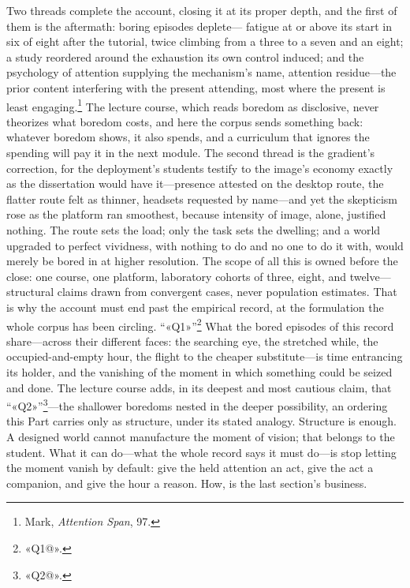 Two threads complete the account, closing it at its proper depth, and the first of them is the aftermath: boring episodes deplete--- fatigue at or above its start in six of eight after the tutorial, twice climbing from a three to a seven and an eight; a study reordered around the exhaustion its own control induced; and the psychology of attention supplying the mechanism's name, attention residue---the prior content interfering with the present attending, most where the present is least engaging.\footnote{Mark, \textit{Attention Span}, 97.} The lecture course, which reads boredom as disclosive, never theorizes what boredom costs, and here the corpus sends something back: whatever boredom shows, it also spends, and a curriculum that ignores the spending will pay it in the next module. The second thread is the gradient's correction, for the deployment's students testify to the image's economy exactly as the dissertation would have it---presence attested on the desktop route, the flatter route felt as thinner, headsets requested by name---and yet the skepticism rose as the platform ran smoothest, because intensity of image, alone, justified nothing. The route sets the load; only the task sets the dwelling; and a world upgraded to perfect vividness, with nothing to do and no one to do it with, would merely be bored in at higher resolution. The scope of all this is owned before the close: one course, one platform, laboratory cohorts of three, eight, and twelve---structural claims drawn from convergent cases, never population estimates. That is why the account must end past the empirical record, at the formulation the whole corpus has been circling. ``«Q1»''\footnote{«Q1@».} What the bored episodes of this record share---across their different faces: the searching eye, the stretched while, the occupied-and-empty hour, the flight to the cheaper substitute---is time entrancing its holder, and the vanishing of the moment in which something could be seized and done. The lecture course adds, in its deepest and most cautious claim, that ``«Q2»''\footnote{«Q2@».}---the shallower boredoms nested in the deeper possibility, an ordering this Part carries only as structure, under its stated analogy. Structure is enough. A designed world cannot manufacture the moment of vision; that belongs to the student. What it can do---what the whole record says it must do---is stop letting the moment vanish by default: give the held attention an act, give the act a companion, and give the hour a reason. How, is the last section's business.

